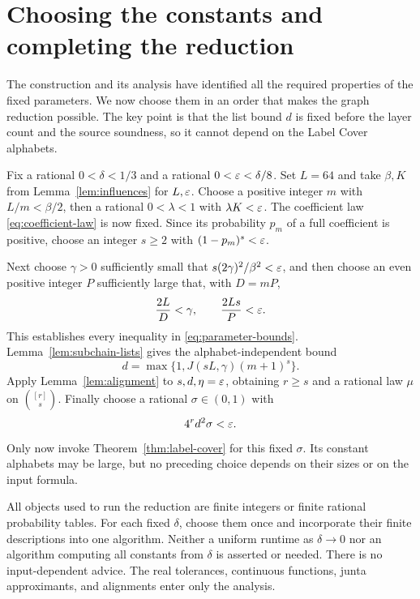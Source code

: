 \section{Choosing the constants and completing the reduction}
\label{sec:parameters}

The construction and its analysis have identified all the required
properties of the fixed parameters. We now choose them in an order
that makes the graph reduction possible. The key point is that the
list bound $d$ is fixed before the layer count and the source soundness,
so it cannot depend on the Label Cover alphabets.

Fix a rational $0<\delta<1/3$ and a rational
$0<\varepsilon<\delta/8$. Set $L=64$ and take $\beta,K$ from
Lemma~\ref{lem:influences} for $L,\varepsilon$.
Choose a positive integer $m$ with $L/m<\beta/2$, then a rational
$0<\lambda<1$ with $\lambda K<\varepsilon$.
The coefficient law \eqref{eq:coefficient-law} is now fixed.
Since its probability $p_m$ of a full coefficient is positive, choose
an integer $s\ge2$ with $(1-p_m)^s<\varepsilon$.

Next choose $\gamma>0$ sufficiently small that
$s(2\gamma)^2/\beta^2<\varepsilon$, and then choose an even positive integer
$P$ sufficiently large that, with $D=mP$,
\[
 \frac{2L}{D}<\gamma,
 \qquad \frac{2Ls}{P}<\varepsilon.
\]
This establishes every inequality in \eqref{eq:parameter-bounds}.
Lemma~\ref{lem:subchain-lists} gives the alphabet-independent bound
\[
 d=\max\{1,J(sL,\gamma)(m+1)^s\}.
\]
Apply Lemma~\ref{lem:alignment} to $s,d,\eta=\varepsilon$, obtaining
$r\ge s$ and a rational law $\mu$ on $\binom{[r]}s$.
Finally choose a rational $\sigma\in(0,1)$ with
\begin{equation}\label{eq:source-soundness}
 4^r d^2\sigma<\varepsilon.
\end{equation}
Only now invoke Theorem~\ref{thm:label-cover} for this fixed $\sigma$.
Its constant alphabets may be large, but no preceding choice depends
on their sizes or on the input formula.

All objects used to run the reduction are finite integers or finite
rational probability tables. For each fixed $\delta$, choose them
once and incorporate their finite descriptions into one algorithm.
Neither a uniform runtime as $\delta\to0$ nor an algorithm computing
all constants from $\delta$ is asserted or needed. There is no
input-dependent advice. The real tolerances, continuous functions,
junta approximants, and alignments enter only the analysis.

